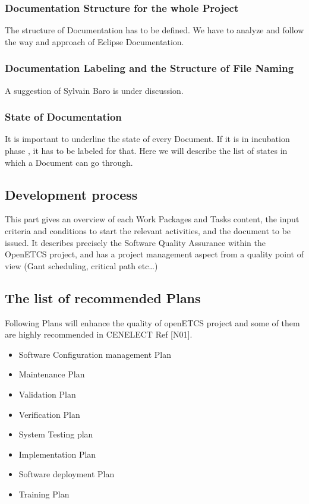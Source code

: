 \documentclass{template/openetcs_article}
\begin{document}
\subsubsection{Documentation Structure for the whole Project}
The structure of Documentation has to be defined. We have to analyze and follow the way and approach of Eclipse Documentation. 

\subsubsection{Documentation Labeling and the Structure of File Naming}
A suggestion of Sylvain Baro is under discussion.

\subsubsection{State of Documentation}
It is important to underline the state of every Document. If it is in incubation phase , it has to be labeled for that. Here we will describe the list of states in which a Document can go through.


\subsection{Development process}
This part gives an overview of each Work Packages and Tasks content, the input criteria and conditions to start the relevant activities, and the document to be issued. It describes precisely the Software Quality Assurance within the OpenETCS project, and has a project management aspect from a quality point of view (Gant scheduling, critical path etc{\dots})


\subsection{The list of recommended Plans}
Following Plans will enhance the quality of openETCS project and some of them are highly recommended in CENELECT Ref [N01].
\begin{itemize}
\item Software Configuration management Plan
\item Maintenance Plan
\item Validation Plan
\item Verification Plan
\item System Testing plan  
\item Implementation Plan
\item Software deployment Plan
\item Training Plan
\end{itemize}
\end{document}
